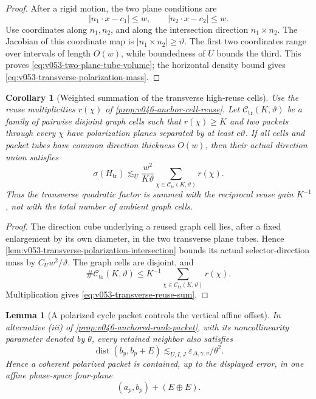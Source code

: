 \documentclass[10pt]{article}
\newtheorem{lemma}[theorem]{Lemma}
\newtheorem{corollary}[theorem]{Corollary}
\begin{document}
\begin{proof}
After a rigid motion, the two plane conditions are
\[
|n_1\cdot x-c_1|\le w,
\qquad
|n_2\cdot x-c_2|\le w.
\]
Use coordinates along \(n_1,n_2\), and along the intersection direction
\(n_1\times n_2\).  The Jacobian of this coordinate map is
\(|n_1\times n_2|\ge\vartheta\).  The first two coordinates range over intervals of length
\(O(w)\), while boundedness of \(U\) bounds the third.  This proves
\eqref{eq:v053-two-plane-tube-volume}; the horizontal density bound gives
\eqref{eq:v053-transverse-polarization-mass}.
\end{proof}

\begin{corollary}[Weighted summation of the transverse high-reuse cells]
\label{cor:v053-transverse-reuse-weighted-sum}
Use the reuse multiplicities \(r(\chi)\) of
\cref{prop:v046-anchor-cell-reuse}.  Let \(\mathcal C_{\mathrm{tr}}(K,\vartheta)\) be a family of
pairwise disjoint graph cells such that \(r(\chi)\ge K\) and two packets through every \(\chi\) have
polarization planes separated by at least \(c\vartheta\).  If all cells and packet tubes have common
direction thickness \(O(w)\), then their actual direction union satisfies
\begin{equation}
\label{eq:v053-transverse-reuse-sum}
\boxed{
\sigma(H_{\mathrm{tr}})
\lesssim_U
\frac{w^2}{K\vartheta}
\sum_{\chi\in\mathcal C_{\mathrm{tr}}(K,\vartheta)}r(\chi).
}
\end{equation}
Thus the transverse quadratic factor is summed with the reciprocal reuse gain \(K^{-1}\), not with
the total number of ambient graph cells.
\end{corollary}

\begin{proof}
The direction cube underlying a reused graph cell lies, after a fixed enlargement by its own
diameter, in the two transverse plane tubes.  Hence
\cref{lem:v053-transverse-polarization-intersection} bounds its actual selector-direction mass by
\(C_Uw^2/\vartheta\).  The graph cells are disjoint, and
\[
\#\mathcal C_{\mathrm{tr}}(K,\vartheta)
\le
K^{-1}
\sum_{\chi\in\mathcal C_{\mathrm{tr}}(K,\vartheta)}r(\chi).
\]
Multiplication gives \eqref{eq:v053-transverse-reuse-sum}.
\end{proof}

\begin{lemma}[A polarized cycle packet controls the vertical affine offset]
\label{lem:v053-polarized-packet-vertical-offset}
In alternative \textnormal{(iii)} of
\cref{prop:v046-anchored-rank-packet}, with its noncollinearity parameter denoted by \(\theta\), every
retained neighbor also satisfies
\begin{equation}
\label{eq:v053-polarized-vertical-plane}
\boxed{
\operatorname{dist}(b_y,b_p+E)
\lesssim_{U,I,J}
\varepsilon_{\Delta,\gamma,\upsilon}/\theta^2.
}
\end{equation}
Hence a coherent polarized packet is contained, up to the displayed error, in one affine phase-space
four-plane
\[
(a_p,b_p)+(E\oplus E).
\]
\end{lemma}
\end{document}
